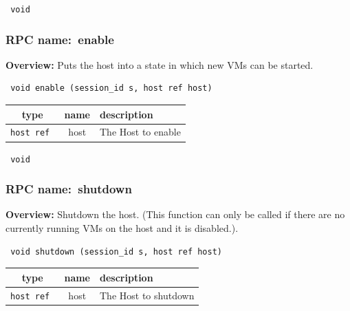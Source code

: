 {\tt 
void
}



\vspace{0.3cm}
\vspace{0.3cm}
\vspace{0.3cm}
\subsubsection{RPC name:~enable}

{\bf Overview:} 
Puts the host into a state in which new VMs can be started.

\begin{verbatim} void enable (session_id s, host ref host)\end{verbatim}



 
\vspace{0.3cm}
\begin{tabular}{|c|c|p{7cm}|}
 \hline
{\bf type} & {\bf name} & {\bf description} \\ \hline
{\tt host ref } & host & The Host to enable \\ \hline 

\end{tabular}

\vspace{0.3cm}

{\tt 
void
}



\vspace{0.3cm}
\vspace{0.3cm}
\vspace{0.3cm}
\subsubsection{RPC name:~shutdown}

{\bf Overview:} 
Shutdown the host. (This function can only be called if there are no
currently running VMs on the host and it is disabled.).

\begin{verbatim} void shutdown (session_id s, host ref host)\end{verbatim}



 
\vspace{0.3cm}
\begin{tabular}{|c|c|p{7cm}|}
 \hline
{\bf type} & {\bf name} & {\bf description} \\ \hline
{\tt host ref } & host & The Host to shutdown \\ \hline 

\end{tabular}


